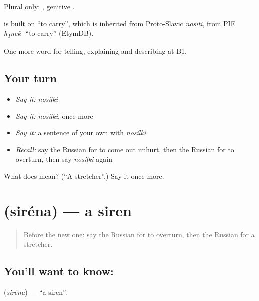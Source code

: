 Plural only: \emph{}, genitive \emph{}.

\begin{cousinweb}
\emph{} is built on \emph{} \textquotedblleft{}to carry\textquotedblright{}, which is inherited from Proto-Slavic \emph{nositi}, from PIE \emph{h\textsubscript{1}ne\'{k}-} \textquotedblleft{}to carry\textquotedblright{} (EtymDB).
\end{cousinweb}

\begin{grammarlens}[title={What you've built}]
One more word for telling, explaining and describing at B1.
\end{grammarlens}

\subsection*{Your turn}
\begin{itemize}
\raggedright
  \item \emph{Say it:} \emph{nosílki}
  \item \emph{Say it:} \emph{nosílki}, once more
  \item \emph{Say it:} a sentence of your own with \emph{nosílki}
  \item \emph{Recall:} say the Russian for to come out unhurt, then the Russian for to overturn, then say \emph{nosílki} again
\end{itemize}

\begin{tcolorbox}[breakable,colback=teal!4,colframe=teal!35!black,title={Before you move on}]
What does  mean? (\textquotedblleft{}A stretcher\textquotedblright{}.) Say it once more.
\end{tcolorbox}
\section[\texorpdfstring{\ru{сирена} (siréna)}{сирена (siréna)}]{ (siréna) — a siren}

\label{lesson:RU-C299-sirena}



\begin{quote}
Before the new one: say the Russian for to overturn, then the Russian for a stretcher.
\end{quote}

\subsection*{You'll want to know: }
\textbf{} (\emph{siréna}) — \textquotedblleft{}a siren\textquotedblright{}.

